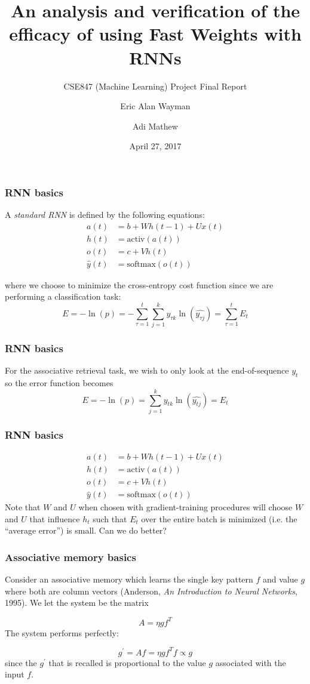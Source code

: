 \documentclass{beamer}
\title{An analysis and verification of the efficacy of using Fast Weights with RNNs}
\subtitle{CSE847 (Machine Learning) Project Final Report}
\author{Eric Alan Wayman\inst{1} \and Adi Mathew\inst{1}}
\institute[Universities Here and There] %
{
  \inst{1}%
  Department of Computer Science and Engineering\\
  Michigan State University
}
\date{April 27, 2017}
\begin{document}
\frame{\titlepage}

\begin{frame}
  \frametitle{RNN basics}
  \begin{definition}
    A \emph{standard RNN} is defined by the following equations:
    \begin{align*}
      a(t) & = b + W h(t-1) + U x(t) \\
      h(t) & = \mbox{activ}(a(t)) \\
      o(t) & = c + V h(t) \\
      \widehat{y}(t) & = \mbox{softmax}(o(t))
    \end{align*}
  \end{definition}
  where we choose to minimize the cross-entropy cost function since we are performing a classification task:
  \begin{equation*}
    E = -\ln(p) = -\sum_{\tau=1}^t \sum_{j=1}^k y_{\tau k} \ln\left(\widehat{y_{\tau j}}\right) = \sum_{\tau=1}^{t} E_t
  \end{equation*}
\end{frame}

\begin{frame}
  \frametitle{RNN basics}
  For the associative retrieval task, we wish to only look at the end-of-sequence $y_t$ so the error function becomes
  \begin{equation*}
    E = -\ln(p) = \sum_{j=1}^k y_{t k} \ln\left(\widehat{y_{t j}}\right) = E_t    
  \end{equation*}
\end{frame}

\begin{frame}
  \frametitle{RNN basics}
    \begin{align*}
      a(t) & = b + W h(t-1) + U x(t) \\
      h(t) & = \mbox{activ}(a(t)) \\
      o(t) & = c + V h(t) \\
      \widehat{y}(t) & = \mbox{softmax}(o(t))
    \end{align*}
  Note that $W$ and $U$ when chosen with gradient-training procedures will choose $W$ and $U$ that influence $h_t$ such that $E_t$ over the entire batch is minimized (i.e. the ``average error'') is small. Can we do better? 
\end{frame}

\begin{frame}
  \frametitle{Associative memory basics}
Consider an associative memory which learns the single key pattern $f$ and value $g$ where both are column vectors (Anderson, \emph{An Introduction to Neural Networks}, 1995). We let the system be the matrix

\begin{equation*}
A = \eta g f^T
\end{equation*}
%
The system performs perfectly:

\begin{equation*}
g^\prime = Af = \eta g f^T f \propto g
\end{equation*}
%
since the $g^\prime$ that is recalled is proportional to the value $g$ associated with the input $f$.
\end{frame}
\end{document}
